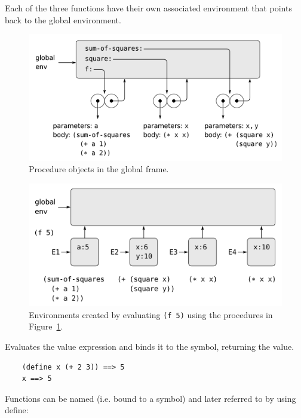 \documentclass[12pt]{article}
\begin{document}
Each of the three functions have their own associated environment that
points back to the global environment.

\begin{figure}[htbp] %
   \centering
   \includegraphics[width=5in]{function_declarations.png} 
\caption{Procedure objects in the global frame.}
\label{fig:funcdefs}
\end{figure}

\begin{figure}[htbp] %
   \centering
   \includegraphics[width=5in]{function_invocations.png} 
\caption[Invocation Environments]{Environments created by evaluating
  {\tt (f 5)} using the procedures in Figure~\ref{fig:funcdefs}.}
\label{fig:funcinvocations}
\end{figure}



Evaluates the value expression and binds it to the symbol, returning
the value. 

\begin{verbatim}
    (define x (+ 2 3)) ==> 5
    x ==> 5
\end{verbatim}

Functions can be named (i.e. bound to a symbol) and later referred to
by using define:
\end{document}
